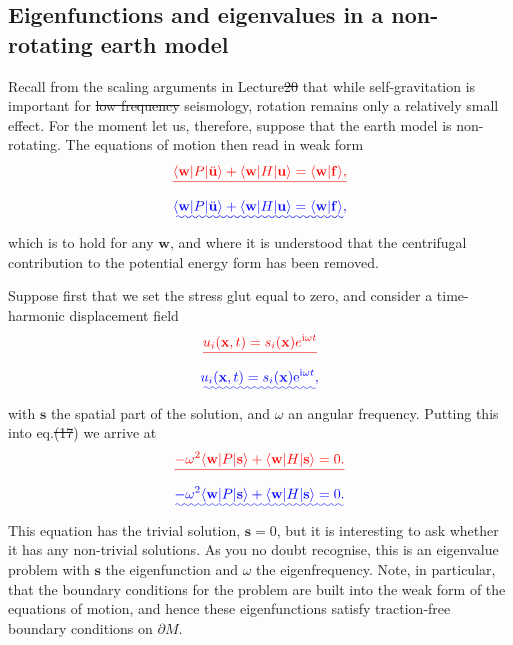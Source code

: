 \documentclass[a4paper,12pt]{paper}
\providecommand{\DIFadd}[1]{{\protect\color{blue}\uwave{#1}}} %
\providecommand{\DIFdel}[1]{{\protect\color{red}\sout{#1}}}                      %
\providecommand{\DIFaddbegin}{} %
\providecommand{\DIFaddend}{} %
\providecommand{\DIFdelbegin}{} %
\providecommand{\DIFdelend}{} %
\begin{document}
\subsection*{Eigenfunctions and eigenvalues in a non-rotating earth model}
Recall from the scaling arguments in Lecture\DIFdelbegin \DIFdel{20 }\DIFdelend \DIFaddbegin \DIFadd{~21 }\DIFaddend that while self-gravitation is important for \DIFdelbegin \DIFdel{low frequency }\DIFdelend \DIFaddbegin \DIFadd{low-frequency }\DIFaddend seismology, rotation remains 
only a relatively small effect. For the moment let us, therefore, suppose that the earth model is non-rotating. The equations of motion then read in weak form
\DIFdelbegin \begin{displaymath}
\DIFdel{\langle \mathbf{w}|P|\ddot{\mathbf{u}}\rangle+\langle \mathbf{w}|H|\mathbf{u}\rangle=\langle \mathbf{w}|\mathbf{f}\rangle,
}\end{displaymath}%
\DIFdelend \DIFaddbegin \begin{equation}
\DIFadd{\langle \mathbf{w}|P|\ddot{\mathbf{u}}\rangle+\langle \mathbf{w}|H|\mathbf{u}\rangle=\langle \mathbf{w}|\mathbf{f}\rangle,
\label{eq:17}
}\end{equation}\DIFaddend 
which is to hold for any $\mathbf{w}$, and where it is understood that the centrifugal contribution to the potential energy form has been removed. 

Suppose first that we set the stress glut equal to zero, and consider a time-harmonic displacement field
\DIFdelbegin \begin{displaymath}
\DIFdel{u_{i}(\mathbf{x},t)=s_{i}(\mathbf{x})e^{\ii\omega t}
}\end{displaymath}%
\DIFdelend \DIFaddbegin \begin{equation}
\DIFadd{u_{i}(\mathbf{x},t)=s_{i}(\mathbf{x})\ee^{\ii\omega t},
\label{eq:18}
}\end{equation}\DIFaddend 
with $\mathbf{s}$ the spatial part of the solution, and $\omega$ an angular frequency. Putting this into eq.\DIFdelbegin \DIFdel{(17}\DIFdelend \DIFaddbegin \DIFadd{~(\ref{eq:17}}\DIFaddend ) we arrive at
\DIFdelbegin \begin{displaymath}
\DIFdel{-\omega^{2}\langle \mathbf{w}|P|\mathbf{s}\rangle+\langle \mathbf{w}|H|\mathbf{s}\rangle=0.
}\end{displaymath}%
\DIFdelend \DIFaddbegin \begin{equation}
\DIFadd{-\omega^{2}\langle \mathbf{w}|P|\mathbf{s}\rangle+\langle \mathbf{w}|H|\mathbf{s}\rangle=0.
\label{eq:19}
}\end{equation}\DIFaddend 
This equation has the trivial solution, $\mathbf{s}=0$, but it is interesting to ask whether it has any non-trivial solutions.
As you no doubt recognise, this is an eigenvalue problem with $\mathbf{s}$ the eigenfunction and $\omega$ the eigenfrequency. 
Note, in particular, that the boundary conditions for the problem are built into the weak form of the equations of motion, 
and hence these eigenfunctions satisfy traction-free boundary conditions on $\partial M$.
\end{document}
